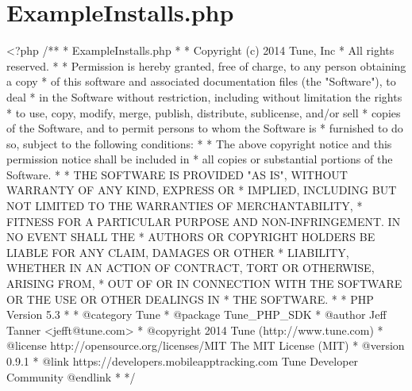 \hypertarget{ExampleInstalls_8php-example}{\section{Example\-Installs.\-php}
}

\begin{DoxyCodeInclude}
<?php\textcolor{comment}{}
\textcolor{comment}{/**}
\textcolor{comment}{ * ExampleInstalls.php}
\textcolor{comment}{ *}
\textcolor{comment}{ * Copyright (c) 2014 Tune, Inc}
\textcolor{comment}{ * All rights reserved.}
\textcolor{comment}{ *}
\textcolor{comment}{ * Permission is hereby granted, free of charge, to any person obtaining a copy}
\textcolor{comment}{ * of this software and associated documentation files (the "Software"), to deal}
\textcolor{comment}{ * in the Software without restriction, including without limitation the rights}
\textcolor{comment}{ * to use, copy, modify, merge, publish, distribute, sublicense, and/or sell}
\textcolor{comment}{ * copies of the Software, and to permit persons to whom the Software is}
\textcolor{comment}{ * furnished to do so, subject to the following conditions:}
\textcolor{comment}{ *}
\textcolor{comment}{ * The above copyright notice and this permission notice shall be included in}
\textcolor{comment}{ * all copies or substantial portions of the Software.}
\textcolor{comment}{ *}
\textcolor{comment}{ * THE SOFTWARE IS PROVIDED "AS IS", WITHOUT WARRANTY OF ANY KIND, EXPRESS OR}
\textcolor{comment}{ * IMPLIED, INCLUDING BUT NOT LIMITED TO THE WARRANTIES OF MERCHANTABILITY,}
\textcolor{comment}{ * FITNESS FOR A PARTICULAR PURPOSE AND NON-INFRINGEMENT. IN NO EVENT SHALL THE}
\textcolor{comment}{ * AUTHORS OR COPYRIGHT HOLDERS BE LIABLE FOR ANY CLAIM, DAMAGES OR OTHER}
\textcolor{comment}{ * LIABILITY, WHETHER IN AN ACTION OF CONTRACT, TORT OR OTHERWISE, ARISING FROM,}
\textcolor{comment}{ * OUT OF OR IN CONNECTION WITH THE SOFTWARE OR THE USE OR OTHER DEALINGS IN}
\textcolor{comment}{ * THE SOFTWARE.}
\textcolor{comment}{ *}
\textcolor{comment}{ * PHP Version 5.3}
\textcolor{comment}{ *}
\textcolor{comment}{ * @category  Tune}
\textcolor{comment}{ * @package   Tune\_PHP\_SDK}
\textcolor{comment}{ * @author    Jeff Tanner <jefft@tune.com>}
\textcolor{comment}{ * @copyright 2014 Tune (http://www.tune.com)}
\textcolor{comment}{ * @license   http://opensource.org/licenses/MIT The MIT License (MIT)}
\textcolor{comment}{ * @version   0.9.1}
\textcolor{comment}{ * @link      https://developers.mobileapptracking.com Tune Developer Community @endlink}
\textcolor{comment}{ *}
\textcolor{comment}{ */}


\end{DoxyCodeInclude}
